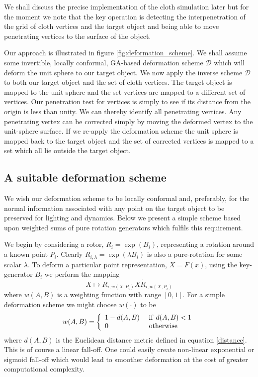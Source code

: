 We shall discuss the precise implementation of the cloth simulation later but
for the moment we note that the key operation is detecting the interpenetration
of the grid of cloth vertices and the target object and being able to move 
penetrating vertices to the surface of the object.

Our approach is illustrated in figure \ref{fig:deformation_scheme}. We shall
assume some invertible, locally conformal, GA-based deformation scheme
$\mathcal{D}$ which will deform the unit sphere to our target object.  We now
apply the inverse scheme $\mathcal{D}$ to both our target object and the set
of cloth vertices. The target object is mapped to the unit sphere and the set
vertices are mapped to a different set of vertices.  Our penetration test for
vertices is simply to see if its distance from the origin is less than unity.
We can thereby identify all penetrating vertices. Any penetrating vertex can
be corrected simply by moving the deformed vertex to the unit-sphere surface.
If we re-apply the deformation scheme the unit sphere is mapped back to the
target object and the set of corrected vertices is mapped to a set which all
lie outside the target object.

\subsection{A suitable deformation scheme}

We wish our deformation scheme to be locally conformal and, preferably, for the
normal information associated with any point on the target object to be preserved
for lighting and dynamics. Below we present a simple scheme based upon weighted sums
of pure rotation generators which fulfils this requirement.

We begin by considering a rotor, $R_i = \exp(B_i)$, representing a rotation around a 
known point $P_i$. Clearly $R_{i,\lambda} = \exp(\lambda B_i)$ is also a pure-rotation
for some scalar $\lambda$. To deform a particular
point representation, $X = F(x)$, using the key-generator $B_i$ we perform the mapping
\[
X \mapsto R_{i,w(X,P_i)}X\tilde{R}_{i,w(X,P_i)}
\]
where $w(A,B)$ is a weighting function with range $[0,1]$. For a simple deformation
scheme we might choose $w(\cdot)$ to be
\[
w(A,B) = \left\{
  \begin{array}{ll}
  1 - d(A,B) &{\rm ~if~} d(A,B) < 1\\
          0 & {\rm ~otherwise}
  \end{array}
  \right.
\]
where $d(A,B)$ is the Euclidean distance metric defined in equation \ref{distance}.
This is of course a linear fall-off. One could easily create non-linear exponential
or sigmoid fall-off which would lead to smoother deformation at the cost of greater
computational complexity.

